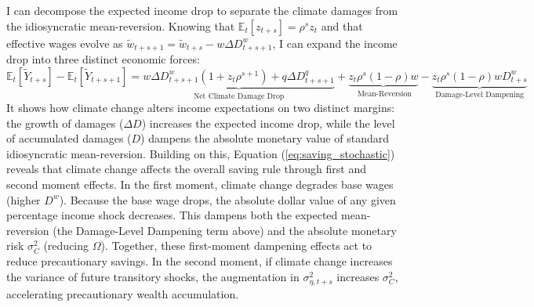\documentclass[12pt, a4paper]{article}
\begin{document}
I can decompose the expected income drop to separate the climate damages from the idiosyncratic mean-reversion. Knowing that $\mathbb{E}_t[z_{t+s}] = \rho^s z_t$ and that effective wages evolve as $\tilde{w}_{t+s+1} = \tilde{w}_{t+s} - w \Delta D^w_{t+s+1}$, I can expand the income drop into three distinct economic forces:
\begin{equation}
    \mathbb{E}_t[\tilde{Y}_{t+s}] - \mathbb{E}_t[\tilde{Y}_{t+s+1}] = \underbrace{w \Delta D^w_{t+s+1} (1 + z_t \rho^{s+1}) + q \Delta D^q_{t+s+1}}_{\text{Net Climate Damage Drop}} + \underbrace{z_t \rho^s (1 - \rho) w}_{\text{ Mean-Reversion}} - \underbrace{z_t \rho^s (1 - \rho) w D^w_{t+s}}_{\text{Damage-Level Dampening}}
    \label{eq:income_drop_decomp}
\end{equation}
It shows how climate change alters income expectations on two distinct margins: the growth of damages ($\Delta D$) increases the expected income drop, while the level of accumulated damages ($D$) dampens the absolute monetary value of standard idiosyncratic mean-reversion. Building on this, Equation (\ref{eq:saving_stochastic}) reveals that climate change affects the overall saving rule through first and second moment effects. In the first moment, climate change degrades base wages (higher $D^w$). Because the base wage drops, the absolute dollar value of any given percentage income shock decreases. This dampens both the expected mean-reversion (the Damage-Level Dampening term above) and the absolute monetary risk $\sigma_C^2$ (reducing $\Omega$). Together, these first-moment dampening effects act to reduce precautionary savings. In the second moment, if climate change increases the variance of future transitory shocks, the augmentation in $\sigma_{\eta, t+s}^2$ increases $\sigma_C^2$, accelerating precautionary wealth accumulation.
\end{document}
